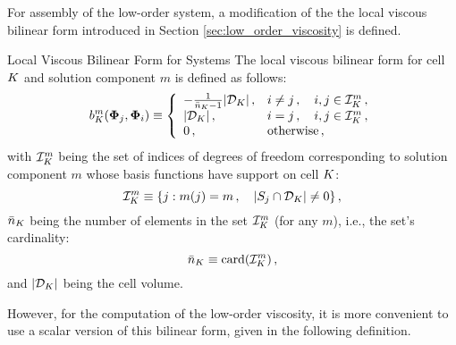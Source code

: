 For assembly of the low-order system, a modification of the
the local viscous bilinear form introduced in Section \ref{sec:low_order_viscosity}
is defined.
\begin{definition}{Local Viscous Bilinear Form for Systems}
   The local viscous bilinear form for cell $K$ and solution component
   $m$ is defined as follows:
   \begin{equation}\label{eq:bilinearform_system}
     \localvisc_{\cell}^m(\vectortestfunction_j,\vectortestfunction_i)
       \equiv \left\{\begin{array}{l l}
         -\frac{1}{\cardsystem_\cell - 1}\cellvolume\eqc & i\ne j\eqc
       \quad i,j\in \indicescell^m\eqc \\
       \cellvolume\eqc & i = j \eqc \quad i,j\in \indicescell^m\eqc \\
       0          \eqc & \mbox{otherwise}\eqc
     \end{array}\right.
   \end{equation}
   with $\indicescell^m$ being the set of indices of degrees of
   freedom corresponding to solution component $m$ whose basis functions
   have support on cell $K$:
   \begin{equation}
     \indicescell^m \equiv \{ j :
       \componentindex(j) = m \eqc \quad|\support_j\cap \celldomain|\ne 0\}
     \eqc
   \end{equation}
   $\bar{n}_K$ being the number of elements in the set $\indicescell^m$
   (for any $m$), i.e., the set's cardinality:
   \begin{equation}
     \cardsystem_\cell \equiv \textup{card}(\indicescell^m) \eqc
   \end{equation} 
   and $|\mathcal{D}_K|$ being the cell volume.
\end{definition}
However, for the computation of the low-order viscosity, it is more convenient
to use a scalar version of this bilinear form, given in the following definition.
